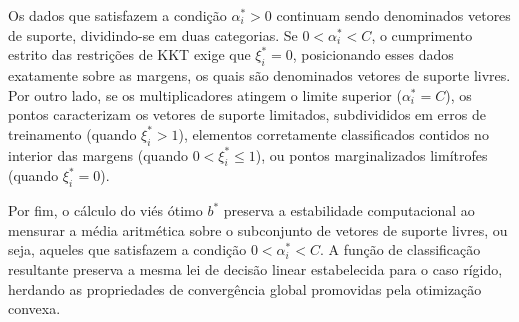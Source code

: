 \documentclass[12pt, a4paper]{article}
\theoremstyle{plain}
\theoremstyle{definition}
\theoremstyle{remark}
\newcommand{\ident}{\hspace{2em}}
\begin{document}
\ident Os dados que satisfazem a condição $\alpha_i^* > 0$ continuam sendo denominados vetores de suporte, dividindo-se em duas categorias. Se $0 < \alpha_i^* < C$, o cumprimento estrito das restrições de KKT exige que $\xi_i^* = 0$, posicionando esses dados exatamente sobre as margens, os quais são denominados vetores de suporte livres. Por outro lado, se os multiplicadores atingem o limite superior ($\alpha_i^* = C$), os pontos caracterizam os vetores de suporte limitados, subdivididos em erros de treinamento (quando $\xi_i^* > 1$), elementos corretamente classificados contidos no interior das margens (quando $0 < \xi_i^* \leq 1$), ou pontos marginalizados limítrofes (quando $\xi_i^* = 0$). 

\ident Por fim, o cálculo do viés ótimo $b^*$ preserva a estabilidade computacional ao mensurar a média aritmética sobre o subconjunto de vetores de suporte livres, ou seja, aqueles que satisfazem a condição $0 < \alpha_i^* < C$. A função de classificação resultante preserva a mesma lei de decisão linear estabelecida para o caso rígido, herdando as propriedades de convergência global promovidas pela otimização convexa.


\end{document}
